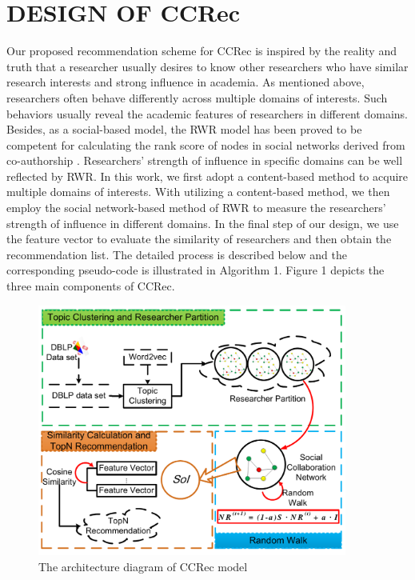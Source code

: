 \documentclass[review]{elsarticle}
\begin{document}
\section{DESIGN OF CCRec}
Our proposed recommendation scheme for CCRec is inspired by the reality and truth that a researcher usually desires to know other researchers who have similar research interests and strong influence in academia. As mentioned above, researchers often behave differently across multiple domains of interests. Such behaviors usually reveal the academic features of researchers in different domains. Besides, as a social-based model, the RWR model has been proved to be competent for calculating the rank score of nodes in social networks derived from co-authorship \cite{li2014acrec}. Researchers' strength of influence in specific domains can be well reflected by RWR. In this work, we first adopt a content-based method to acquire multiple domains of interests. With utilizing a content-based method, we then employ the social network-based method of RWR to measure the researchers' strength of influence in different domains. In the final step of our design, we use the feature vector to evaluate the similarity of researchers and then obtain the recommendation list. The detailed process is described below and the corresponding pseudo-code is illustrated in Algorithm 1. Figure 1 depicts the three main components of CCRec.

\begin{figure}
\centering
\includegraphics [width=4in]{Fig1.pdf}
\caption{The architecture diagram of CCRec model}
\end{figure}
\end{document}
